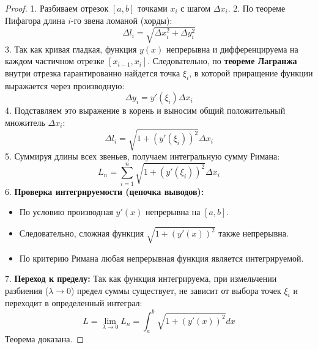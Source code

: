 \begin{center}
\end{center}

\begin{proof}
1. Разбиваем отрезок $[a, b]$ точками $x_i$ с шагом $\Delta x_i$. 
2. По теореме Пифагора длина $i$-го звена ломаной (хорды):
$$\Delta l_i = \sqrt{\Delta x_i^2 + \Delta y_i^2}$$
3. Так как кривая гладкая, функция $y(x)$ непрерывна и дифференцируема на каждом частичном отрезке $[x_{i-1}, x_i]$. Следовательно, по \textbf{теореме Лагранжа} внутри отрезка гарантированно найдется точка $\xi_i$, в которой приращение функции выражается через производную:
$$\Delta y_i = y'(\xi_i) \Delta x_i$$
4. Подставляем это выражение в корень и выносим общий положительный множитель $\Delta x_i$:
$$\Delta l_i = \sqrt{1 + (y'(\xi_i))^2} \Delta x_i$$
5. Суммируя длины всех звеньев, получаем интегральную сумму Римана:
$$L_n = \sum_{i=1}^n \sqrt{1 + (y'(\xi_i))^2} \Delta x_i$$
6. \textbf{Проверка интегрируемости (цепочка выводов):}
\begin{itemize}
    \item По условию производная $y'(x)$ непрерывна на $[a, b]$.
    \item Следовательно, сложная функция $\sqrt{1 + (y'(x))^2}$ также непрерывна.
    \item По критерию Римана любая непрерывная функция является интегрируемой.
\end{itemize}
7. \textbf{Переход к пределу:}
Так как функция интегрируема, при измельчении разбиения ($\lambda \to 0$) предел суммы существует, не зависит от выбора точек $\xi_i$ и переходит в определенный интеграл:
$$L = \lim_{\lambda \to 0} L_n = \int_a^b \sqrt{1 + (y'(x))^2} dx$$
Теорема доказана.
\end{proof}

